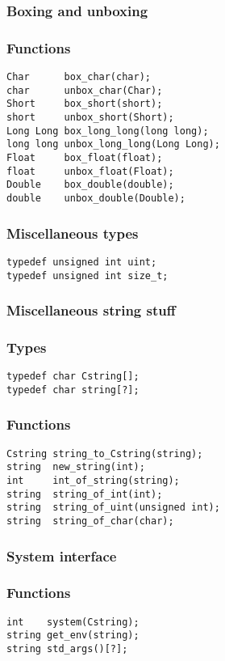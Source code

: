 \subsubsection*{Boxing and unboxing}
\subsubsection*{Functions}
\begin{verbatim}
Char      box_char(char);
char      unbox_char(Char);
Short     box_short(short);
short     unbox_short(Short);
Long Long box_long_long(long long);
long long unbox_long_long(Long Long);
Float     box_float(float);
float     unbox_float(Float);
Double    box_double(double);
double    unbox_double(Double);
\end{verbatim}

\subsubsection*{Miscellaneous types}
\begin{verbatim}
typedef unsigned int uint;
typedef unsigned int size_t;
\end{verbatim}

\subsubsection*{Miscellaneous string stuff}
\subsubsection*{Types}
\begin{verbatim}
typedef char Cstring[];
typedef char string[?];
\end{verbatim}

\subsubsection*{Functions}
\begin{verbatim}
Cstring string_to_Cstring(string);
string  new_string(int);
int     int_of_string(string);
string  string_of_int(int);
string  string_of_uint(unsigned int);
string  string_of_char(char);
\end{verbatim}

\subsubsection*{System interface}
\subsubsection*{Functions}
\begin{verbatim}
int    system(Cstring);
string get_env(string);
string std_args()[?];
\end{verbatim}

